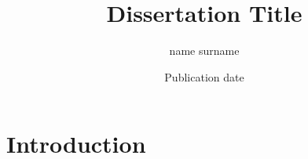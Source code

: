 

\usepackage[version=3]{mhchem}%
\usepackage{siunitx}%
\usepackage{url}%



\title{Dissertation Title}
\author{name surname}
\date{Publication date}



\frontmatter%

\chapter{Introduction}


%
\bibliomatter




\appendix


